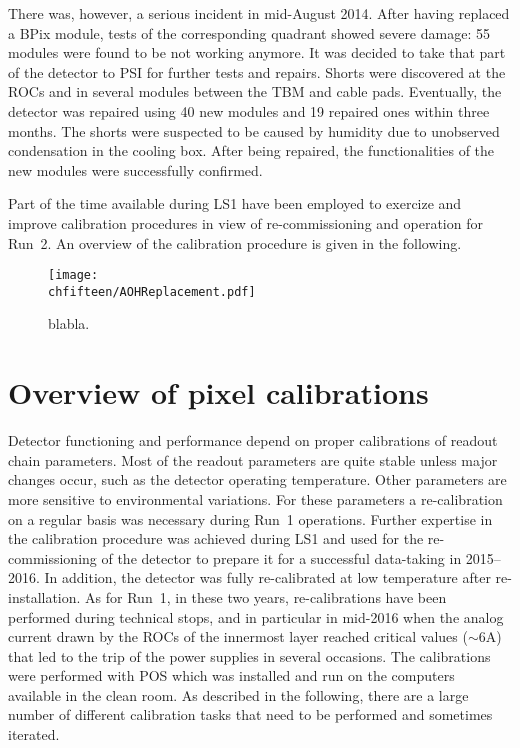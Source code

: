 There was, however, a serious incident in mid-August 2014. After having replaced a BPix module, tests of the corresponding quadrant showed severe damage: 55 modules were found to be not working anymore. It was decided to take that part of the detector to PSI for further tests and repairs. Shorts were discovered at the ROCs and in several modules between the TBM and cable pads. Eventually, the detector was repaired using 40 new modules and 19 repaired ones within three months. The shorts were suspected to be caused by humidity due to unobserved condensation in the cooling box. 
After being repaired, the functionalities of the new modules were successfully confirmed.

Part of the time available during LS1 have been employed to exercize and improve calibration procedures in view of re-commissioning and operation for Run~2.
An overview of the calibration procedure is given in the following.

\begin{figure}[!htb]
 \begin{center}
 \texttt{[image: \\chfifteen/AOHReplacement.pdf]}
 \end{center}
 \caption{blabla.}
 \label{fig:AOHreplace}
\end{figure}

\section{Overview of pixel calibrations}

Detector functioning and performance depend on proper calibrations of readout chain parameters.
Most of the readout parameters are quite stable unless major changes occur, such as the detector operating temperature.
Other parameters are more sensitive to environmental variations.
For these parameters a re-calibration on a regular basis was necessary during Run~1 operations.
Further expertise in the calibration procedure was achieved during LS1 and used 
for the re-commissioning of the detector to prepare it for a successful data-taking in 2015--2016.
In addition, the detector was fully re-calibrated at low temperature after re-installation.
As for Run~1, in these two years, re-calibrations have been performed during technical stops, and in particular in mid-2016 when the analog current drawn by the ROCs of the innermost layer reached critical values ($\sim 6$\unit{A}) that led to the trip of the power supplies in several occasions.
The calibrations were performed with POS which was installed and run on the computers available in the clean room.
As described in the following, there are a large number of different calibration tasks that need to be performed and sometimes iterated.

